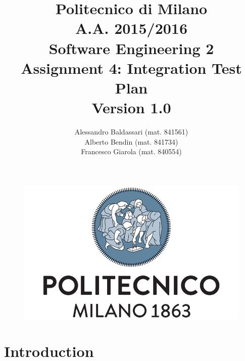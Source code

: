 \documentclass[a4paper,11pt]{report} %
\title{Politecnico di Milano\\A.A. 2015/2016\\Software Engineering 2\\ \bigskip 
Assignment 4: Integration Test Plan\\
{\normalsize Version 1.0}}
\author{Alessandro Baldassari (mat. 841561) \\ Alberto Bendin (mat. 841734) \\ Francesco Giarola (mat. 840554)}
\begin{document}
	
	
	\begin{figure}[t]
		\centering
		\includegraphics[width=1\linewidth]{"Pictures/polimi-logo"}
		\label{fig:polimi-logo}
	\end{figure}
	
	\maketitle
		
	
	\thispagestyle{empty}
	\clearpage\mbox{}\clearpage

	
	
	
	\renewcommand*\thesection{\arabic{section}}
	\renewcommand*\thesubsection{\arabic{section}.\arabic{subsection}}
	\renewcommand*\thesubsubsection{%
	\arabic{section}.\arabic{subsection}.\arabic{subsubsection}%
	}
	\setcounter{secnumdepth}{4}
	\setcounter{tocdepth}{4}
	

	
	\tableofcontents
	\newpage
	
	
	
	\renewcommand{\arraystretch}{1.2}
	\setlength{\tabcolsep}{12pt}
	
	\section{Introduction} 
\end{document}
